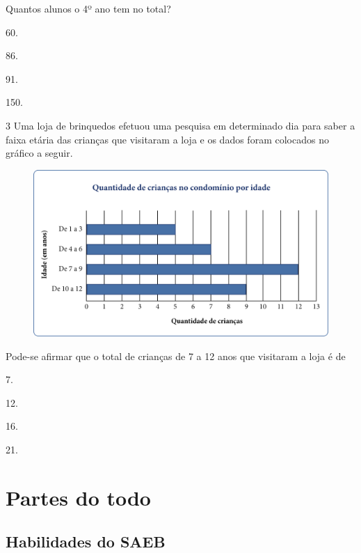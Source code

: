Quantos alunos o 4º ano tem no total?

\begin{escolha}
\item
  60.
\item
  86.
\item
  91.
\item
  150.
\end{escolha}



\num{3} Uma loja de brinquedos efetuou uma pesquisa em determinado dia para
saber a faixa etária das crianças que visitaram a loja e os dados foram
colocados no gráfico a seguir.

\begin{figure}[htpb!]
\centering
\includegraphics[width=\textwidth]{media/image51.png}
\end{figure}

Pode-se afirmar que o total de crianças
de 7 a 12 anos que visitaram a loja é de

\begin{escolha}
\item
  7.
\item
  12.
\item
  16.
\item
  21.
\end{escolha}


\chapter{Partes do todo}

\section*{Habilidades do SAEB}

